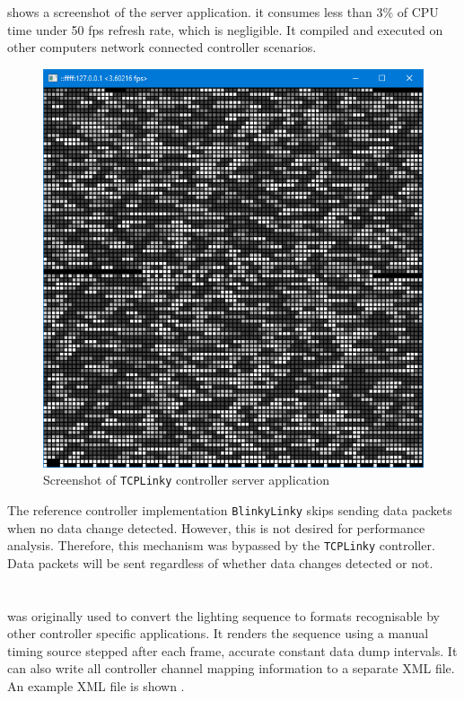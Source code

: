 shows a screenshot of the server application.   it consumes less than $3 \%$ of CPU time under 50 fps refresh rate, which is negligible. It  compiled and executed on other computers  network connected controller scenarios. 

\begin{figure}[t]
  \centering
  \includegraphics[width=0.6\columnwidth]{Figs/tcplinky_server.png}
  \caption{\footnotesize Screenshot of \texttt{TCPLinky} controller server application}
  \label{fig:tcplinky_server}
\end{figure}

The reference controller implementation \texttt{BlinkyLinky} skips sending data packets when no data change  detected. However, this is not desired for performance analysis. Therefore, this mechanism was bypassed by the \texttt{TCPLinky} controller. Data packets will be sent regardless of whether data changes  detected or not.

\section{}


 was originally used to convert the lighting sequence to formats recognisable by other controller specific applications. It renders the sequence using a manual timing source stepped after each frame,  accurate constant data dump intervals. It can also write all controller channel mapping information to a separate XML file. An example XML file is shown  .

